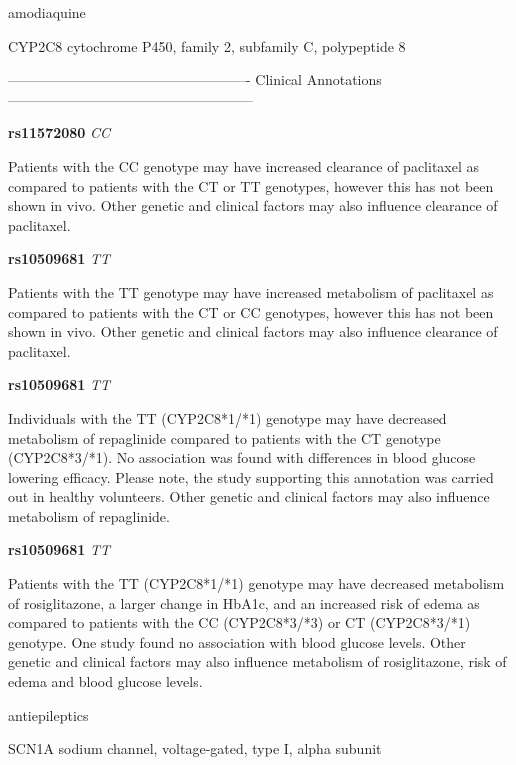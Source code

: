 \documentclass{resume} %
\begin{document}
\begin{rSection}{ amodiaquine }
\begin{rSubsection}{ CYP2C8 }{ cytochrome P450, family 2, subfamily C, polypeptide 8 }{}{}
\item[] ---------------------------------------------------- Clinical Annotations -----------------------------------------------------\newline
\item \textbf{ rs11572080 } \textit{ CC }
\item[] Patients with the CC genotype may have increased clearance of paclitaxel as compared to patients with the CT or TT genotypes, however this has not been shown in vivo. Other genetic and clinical factors may also influence clearance of paclitaxel.\item \textbf{ rs10509681 } \textit{ TT }
\item[] Patients with the TT genotype may have increased metabolism of paclitaxel as compared to patients with the CT or CC genotypes, however this has not been shown in vivo. Other genetic and clinical factors may also influence clearance of paclitaxel.\item \textbf{ rs10509681 } \textit{ TT }
\item[] Individuals with the TT (CYP2C8*1/*1) genotype may have decreased metabolism of repaglinide compared to patients with the CT genotype (CYP2C8*3/*1). No association was found with differences in blood glucose lowering efficacy. Please note, the study supporting this annotation was carried out in healthy volunteers. Other genetic and clinical factors may also influence metabolism of repaglinide.\item \textbf{ rs10509681 } \textit{ TT }
\item[] Patients with the TT (CYP2C8*1/*1) genotype may have decreased metabolism of rosiglitazone, a larger change in HbA1c, and an increased risk of edema as compared to patients with the CC (CYP2C8*3/*3) or CT (CYP2C8*3/*1) genotype. One study found no association with blood glucose levels. Other genetic and clinical factors may also influence metabolism of rosiglitazone, risk of edema and blood glucose levels.
\end{rSubsection}

\end{rSection}\begin{rSection}{ antiepileptics }
\item[]

\begin{rSubsection}{ SCN1A }{ sodium channel, voltage-gated, type I, alpha subunit }{}{}
\item[]


\end{rSubsection}
\end{rSection}
\end{document}
